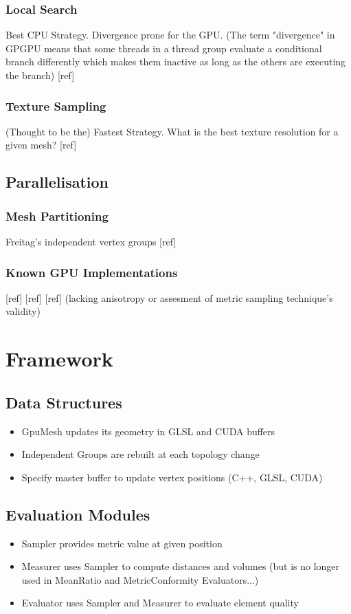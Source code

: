 \documentclass[preprint,12pt]{elsarticle}
\begin{document}
\subsubsection{Local Search}
\label{}
Best CPU Strategy. Divergence prone for the GPU. (The term "divergence" in GPGPU means that some threads in a thread group evaluate a conditional branch differently which makes them inactive as long as the others are executing the branch)
[ref]

\subsubsection{Texture Sampling}
\label{}
(Thought to be the) Fastest Strategy. What is the best texture resolution for a given mesh?
[ref]


\subsection{Parallelisation}
\label{}

\subsubsection{Mesh Partitioning}
\label{}
Freitag's independent vertex groups
[ref]

\subsubsection{Known GPU Implementations}
\label{}
[ref]
[ref]
[ref] (lacking anisotropy or assesment of metric sampling technique's validity)


\section{Framework}
\label{}

\subsection{Data Structures}
\label{}
\begin{itemize}
\item GpuMesh updates its geometry in GLSL and CUDA buffers
\item Independent Groups are rebuilt at each topology change
\item Specify master buffer to update vertex positions (C++, GLSL, CUDA)
\end{itemize}

\subsection{Evaluation Modules}
\label{}
\begin{itemize}
\item Sampler provides metric value at given position
\item Measurer uses Sampler to compute distances and volumes (but is no longer used in MeanRatio and MetricConformity Evaluators...)
\item Evaluator uses Sampler and Measurer to evaluate element quality
\end{itemize}
\end{document}
